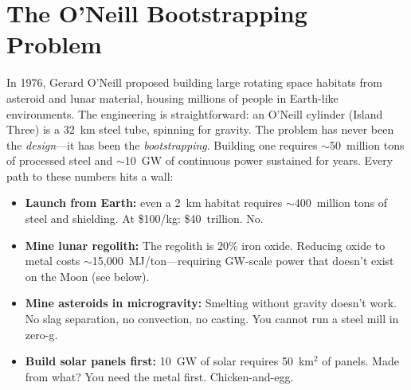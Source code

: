 \documentclass[12pt,letterpaper]{article}
\begin{document}
\begin{titlepage}
\begin{abstract}
For Mars delivery, the mass driver launches steel sections at the departing habitat---each catch simultaneously builds the structure and provides propulsion (no propellant expended). Autonomous robots complete the interior during the 10-year transit. At the destination, the habitat drops a superconducting cable to the surface, mines a local moon for fuel, and replicates the gravity plant---a self-propagating industrial architecture.

At \$40B for 1.2~GW (vs.\ \$50--70B for equivalent lunar nuclear power, which requires enriched uranium launched from Earth and 100,000~m$^2$ of waste-heat radiators), this system provides a credible path from a Starship launch contract to a self-sustaining industrial civilization across the solar system.
\end{abstract}
\end{titlepage}

\tableofcontents
\newpage

\section{The O'Neill Bootstrapping Problem}

In 1976, Gerard O'Neill proposed building large rotating space habitats from asteroid and lunar material, housing millions of people in Earth-like environments. The engineering is straightforward: an O'Neill cylinder (Island Three) is a 32~km steel tube, spinning for gravity. The problem has never been the \emph{design}---it has been the \emph{bootstrapping}. Building one requires $\sim$50~million tons of processed steel and $\sim$10~GW of continuous power sustained for years. Every path to these numbers hits a wall:

\begin{itemize}
\item \textbf{Launch from Earth:} even a 2~km habitat requires $\sim$400~million tons of steel and shielding. At \$100/kg: \$40~trillion. No.
\item \textbf{Mine lunar regolith:} The regolith is 20\% iron oxide. Reducing oxide to metal costs $\sim$15,000~MJ/ton---requiring GW-scale power that doesn't exist on the Moon (see below).
\item \textbf{Mine asteroids in microgravity:} Smelting without gravity doesn't work. No slag separation, no convection, no casting. You cannot run a steel mill in zero-g.
\item \textbf{Build solar panels first:} 10~GW of solar requires 50~km$^2$ of panels. Made from what? You need the metal first. Chicken-and-egg.
\end{itemize}
\end{document}
